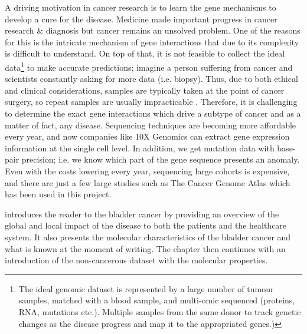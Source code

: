 A driving motivation in cancer research is to learn the gene mechanisms to develop a cure for the disease. Medicine made important progress in cancer research \& diagnosis but cancer remains an unsolved problem. One of the reasons for this is the intricate mechanism of gene interactions that due to its complexity is difficult to understand. On top of that, it is not feasible to collect the ideal data\footnote{The ideal genomic dataset is represented by a large number of tumour samples, matched with a blood sample, and multi-omic sequenced (proteins, RNA, mutations etc.). Multiple samples from the same donor to track genetic changes as the disease progress and map it to the appropriated genes.)} to make accurate predictions; imagine a person suffering from cancer and scientists constantly asking for more data (i.e. biopsy). Thus, due to both ethical and clinical considerations, samples are typically taken at the point of cancer surgery, so repeat samples are usually impracticable . Therefore, it is challenging to determine the exact gene interactions which drive a subtype of cancer and as a matter of fact, any disease. 
Sequencing techniques are becoming more affordable every year, and now companies like 10X Genomics can extract gene expression information at the single cell level. In addition, we get mutation data with base-pair precision; i.e. we know which part of the gene sequence presents an anomaly. Even with the costs lowering every year, sequencing large cohorts is expensive, and there are just a few large studies such as The Cancer Genome Atlas which has been used in this project.


 introduces the reader to the bladder cancer by providing an overview of the global and local impact of the disease to both the patients and the healthcare system. It also presents the molecular characteristics of the bladder cancer and what is known at the moment of writing. The chapter then continues with an introduction of the non-cancerous dataset with the molecular properties.

